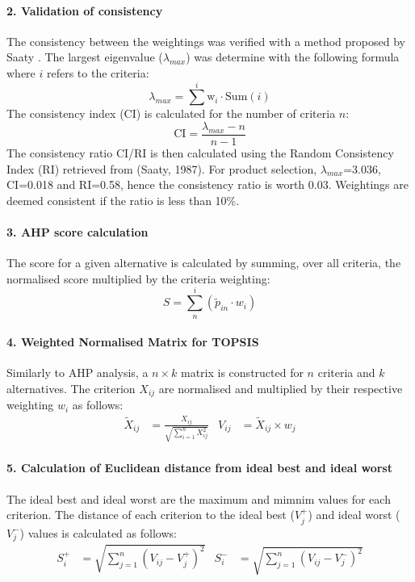 \paragraph{2. Validation of consistency}
The consistency between the weightings was verified with a method proposed by Saaty \cite{saaty_analytic_1987}. The largest eigenvalue ($\lambda_{max}$) was determine with the following formula where $i$ refers to the criteria:
\begin{equation}
    \lambda_{max}=\sum^{i} \mathrm{w}_{i}\cdot \mathrm{Sum}(i)
\end{equation}
The consistency index (CI) is calculated for the number of criteria $n$:
\begin{equation}
   \mathrm{CI} = \frac{\lambda_{max}-n}{n-1}
\end{equation}
The consistency ratio CI/RI is then calculated using the Random Consistency Index (RI) retrieved from (Saaty, 1987). 
For product selection, $\lambda_{max}$=3.036, CI=0.018 and RI=0.58, hence the consistency ratio is worth 0.03. Weightings are deemed consistent if the ratio is less than 10\%.\\

\paragraph{3. AHP score calculation}
The score for a given alternative is calculated by summing, over all criteria, the normalised score multiplied by the criteria weighting:
\begin{equation}
    S=\sum^{i}_{n}(\tilde{p}_{in} \cdot w_{i})
\end{equation}

\paragraph{4. Weighted Normalised Matrix for TOPSIS}
Similarly to AHP analysis, a $n\times k$ matrix is constructed for $n$ criteria and $k$ alternatives. The criterion $X_{ij}$ are normalised and multiplied by their respective weighting $w_i$ as follows:
\begin{align}
    \tilde{X}_{ij}&=\frac{X_{ij}}{\sqrt{\sum^{n}_{i=1}X_{ij}^{2}}} &
    V_{ij}&=\tilde{X}_{ij}\times w_j
\end{align}

\paragraph{5. Calculation of Euclidean distance from ideal best and ideal worst}
The ideal best and ideal worst are the maximum and mimnim values for each criterion. The distance of each criterion to the ideal best ($V_{j}^{+}$) and ideal worst ($V_{j}^{-}$) values is calculated as follows:
\begin{align}
    S_{i}^{+}&=\sqrt{\sum_{j=1}^{n}(V_{ij}-V_{j}^{+})^2} &
    S_{i}^{-}&=\sqrt{\sum_{j=1}^{n}(V_{ij}-V_{j}^{-})^2}
\end{align}

